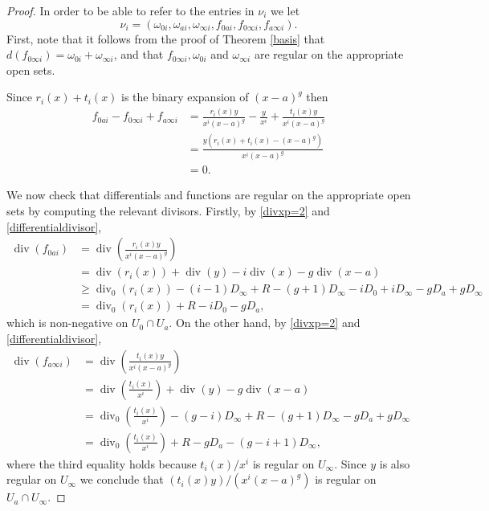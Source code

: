 \documentclass[11pt]{article} %
\theoremstyle{plain}
\theoremstyle{remark}
\DeclareMathOperator{\di}{div}
\begin{document}
\begin{proof}
In order to be able to refer to the entries in $\nu_i$ we let
\[
\nu_i = \left( \omega_{0 i}, \omega_{a i}, \omega_{\infty i}, f_{0 a i}, f_{0 \infty i}, f_{a \infty i} \right).
\]
First, note that it follows from the proof of Theorem \ref{basis} that $d(f_{0 \infty i}) = \omega_{0 i} + \omega_{\infty i}$, and that $f_{0 \infty i}, \omega_{0 i}$ and $\omega_{\infty i}$ are regular on the appropriate open sets.

Since $r_i(x)+t_i(x)$ is the binary expansion of $(x-a)^g$ then
\begin{align*}
f_{0 a i} - f_{0 \infty i}+ f_{a \infty i} & = \frac{r_i(x)y}{x^i(x-a)^g} - \frac{y}{x^i} + \frac{t_i(x)y}{x^i(x-a)^g} \\
& = \frac{y(r_i(x) + t_i(x) - (x-a)^g)}{x^i(x-a)^g} \\
& = 0.
\end{align*}



We now check that differentials and functions are regular on the appropriate open sets by computing the relevant divisors.
Firstly, by \eqref{divxp=2} and \eqref{differentialdivisor},
\begin{align*}
\di \left( f_{0 a i} \right) & = \di \left( \frac{r_i(x)y}{x^i(x-a)^g} \right) \\
&  = \di(r_i(x)) + \di(y) - i\di(x) - g\di(x-a) \\
& \geq \di_0(r_i(x)) - (i-1)D_\infty +R - (g+1)D_\infty - iD_0 + iD_\infty - gD_a + gD_\infty \\
& = \di_0(r_i(x)) +R -iD_0 - gD_a,
\end{align*}
which is non-negative on $U_0 \cap U_a$.
On the other hand, by \eqref{divxp=2} and \eqref{differentialdivisor},
\begin{align*}
\di \left( f_{a \infty i} \right) & = \di \left( \frac{t_i(x)y}{x^i(x-a)^g} \right) \\
& = \di\left(\frac{t_i(x)}{x^i}\right) + \di(y) - g\di(x-a) \\
& = \di_0 \left( \frac{t_i(x)}{x^i} \right) - (g-i)D_\infty +R - (g+1)D_\infty - gD_a + gD_\infty\\
& = \di_0 \left( \frac{t_i(x)}{x^i} \right) +R - gD_a -(g-i+1)D_\infty,
\end{align*}
where the third equality holds because $t_i(x)/x^i$ is regular on $U_\infty$.
Since $y$ is also regular on $U_\infty$  we conclude that $({t_i(x)y})/({x^i(x-a)^g})$ is regular on $U_a \cap U_\infty$.


\end{proof}
\end{document}
